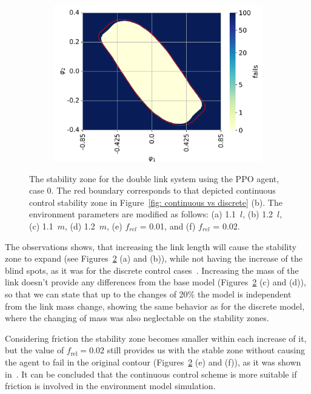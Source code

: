\begin{figure}[h!]
\begin{subfigure}[t]{0.32\textwidth}
         \includegraphics[width=\textwidth]{Figures/DP_friction_0.02.png}
         \label{fig: DP friction 0.02}
         \caption{}
     \end{subfigure}

     \caption{The stability zone for the double link system using the PPO agent, case 0. The red boundary corresponds to that depicted continuous control stability zone in Figure~\ref{fig: continuous vs discrete} (b). The environment parameters are modified as follows: (a) 1.1~$l$, (b) 1.2~$l$, (c) 1.1~$m$, (d) 1.2~$m$, (e) $f_{rel}$ = 0.01, and (f) $f_{rel}$ = 0.02.}
     \label{fig: agent impact on different environments}
 \end{figure}

The observations shows, that increasing the link length will cause the stability zone to expand (see Figures~\ref{fig: agent impact on different environments} (a) and (b)), while not having the increase of the blind spots, as it was for the discrete control cases~\cite{manzl2023relrl}. Increasing the mass of the link doesn't provide any differences from the base model (Figures~\ref{fig: agent impact on different environments} (c) and (d)), so that we can state that up to the changes of 20\% the model is independent from the link mass change, showing the same behavior as for the discrete model, where the changing of mass was also neglectable on the stability zones.

Considering friction the stability zone becomes smaller within each increase of it, but the value of \( f_{\text{rel}} = 0.02 \) still provides us with the stable zone without causing the agent to fail in the original contour (Figures~\ref{fig: agent impact on different environments} (e) and (f)), as it was shown in~\cite{manzl2023relrl}. It can be concluded that the continuous control scheme is more suitable if friction is involved in the environment model simulation.

